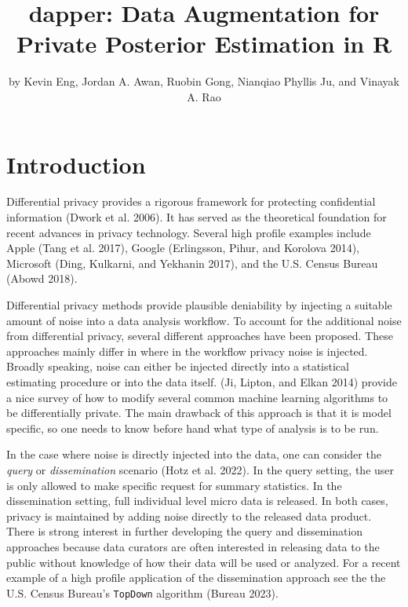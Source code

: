 \title{dapper: Data Augmentation for Private Posterior Estimation in R}


\author{by Kevin Eng, Jordan A. Awan, Ruobin Gong, Nianqiao Phyllis Ju, and Vinayak A. Rao}

\maketitle


\hypertarget{introduction}{%
\section{Introduction}\label{introduction}}

Differential privacy provides a rigorous framework for protecting
confidential information (Dwork et al. 2006). It has served as the theoretical foundation for recent advances in privacy technology. Several high profile
examples include Apple (Tang et al. 2017), Google (Erlingsson, Pihur, and Korolova 2014), Microsoft (Ding, Kulkarni, and Yekhanin 2017), and the
U.S. Census Bureau (Abowd 2018).

Differential privacy methods provide plausible deniability by injecting a suitable amount of
noise into a data analysis workflow. To account for the additional
noise from differential privacy, several different approaches
have been proposed. These approaches mainly differ in where in the workflow privacy noise is injected.
Broadly speaking, noise can either be injected directly into a statistical estimating
procedure or into the data itself. (Ji, Lipton, and Elkan 2014)
provide a nice survey of how to modify several common machine learning algorithms
to be differentially private. The main drawback of this approach
is that it is model specific, so one needs to know before hand
what type of analysis is to be run.

In the case where noise is directly injected into the data, one can
consider the \emph{query} or \emph{dissemination} scenario (Hotz et al. 2022). In the query setting,
the user is only allowed to make specific request for summary statistics.
In the dissemination setting, full individual level micro data is released.
In both cases, privacy is maintained by adding noise directly to the released data product.
There is strong interest in further developing the query and dissemination approaches because data curators are often interested
in releasing data to the public without knowledge of how their data will
be used or analyzed. For a recent example of a high profile application of the dissemination approach
see the the U.S. Census Bureau's \texttt{TopDown} algorithm (Bureau 2023).

